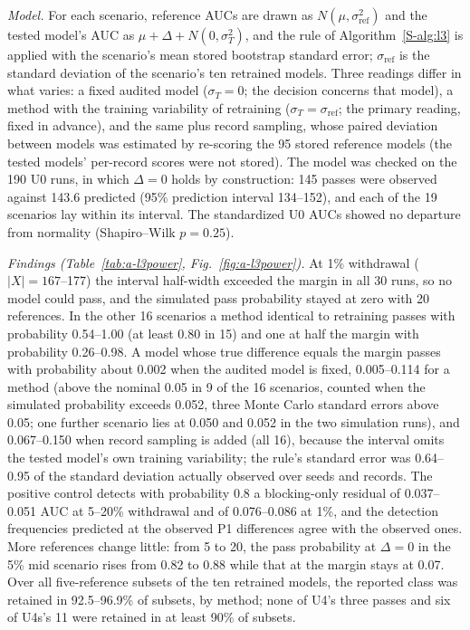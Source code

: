 \emph{Model.} For each scenario, reference AUCs are drawn as $N(\mu,\sigma_{\mathrm{ref}}^2)$ and the tested model's AUC as $\mu+\Delta+N(0,\sigma_T^2)$, and the rule of Algorithm~\ref{S-alg:l3} is applied with the scenario's mean stored bootstrap standard error; $\sigma_{\mathrm{ref}}$ is the standard deviation of the scenario's ten retrained models. Three readings differ in what varies: a fixed audited model ($\sigma_T=0$; the decision concerns that model), a method with the training variability of retraining ($\sigma_T=\sigma_{\mathrm{ref}}$; the primary reading, fixed in advance), and the same plus record sampling, whose paired deviation between models was estimated by re-scoring the 95 stored reference models (the tested models' per-record scores were not stored). The model was checked on the 190 U0 runs, in which $\Delta=0$ holds by construction: 145 passes were observed against 143.6 predicted (95\% prediction interval 134--152), and each of the 19 scenarios lay within its interval. The standardized U0 AUCs showed no departure from normality (Shapiro--Wilk $p=0.25$).

\emph{Findings (Table~\ref{tab:a-l3power}, Fig.~\ref{fig:a-l3power}).} At 1\% withdrawal ($|X|=167$--177) the interval half-width exceeded the margin in all 30 runs, so no model could pass, and the simulated pass probability stayed at zero with 20 references. In the other 16 scenarios a method identical to retraining passes with probability 0.54--1.00 (at least 0.80 in 15) and one at half the margin with probability 0.26--0.98. A model whose true difference equals the margin passes with probability about 0.002 when the audited model is fixed, 0.005--0.114 for a method (above the nominal 0.05 in 9 of the 16 scenarios, counted when the simulated probability exceeds 0.052, three Monte Carlo standard errors above 0.05; one further scenario lies at 0.050 and 0.052 in the two simulation runs), and 0.067--0.150 when record sampling is added (all 16), because the interval omits the tested model's own training variability; the rule's standard error was 0.64--0.95 of the standard deviation actually observed over seeds and records. The positive control detects with probability 0.8 a blocking-only residual of 0.037--0.051 AUC at 5--20\% withdrawal and of 0.076--0.086 at 1\%, and the detection frequencies predicted at the observed P1 differences agree with the observed ones. More references change little: from 5 to 20, the pass probability at $\Delta=0$ in the 5\% mid scenario rises from 0.82 to 0.88 while that at the margin stays at 0.07. Over all five-reference subsets of the ten retrained models, the reported class was retained in 92.5--96.9\% of subsets, by method; none of U4's three passes and six of U4s's 11 were retained in at least 90\% of subsets.

